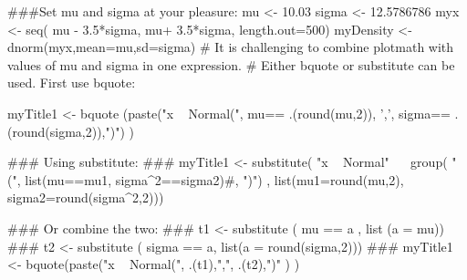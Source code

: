 \begin{Schunk}
\begin{Sinput}
 ###Set mu and sigma at your pleasure:
 mu <- 10.03
 sigma <- 12.5786786
 myx <- seq( mu - 3.5*sigma,  mu+ 3.5*sigma, length.out=500)
 myDensity <- dnorm(myx,mean=mu,sd=sigma)
 # It is challenging to combine plotmath with values of mu and sigma in one expression.
 # Either bquote or substitute can be used.  First use bquote:
 
 myTitle1 <- bquote (paste("x ~ Normal(", mu== .(round(mu,2)), ',', sigma== .(round(sigma,2)),")") )
 
 ### Using substitute:
 ### myTitle1 <-  substitute( "x ~ Normal" ~~ group( "(", list(mu==mu1, sigma^2==sigma2)#, ")") ,  list(mu1=round(mu,2), sigma2=round(sigma^2,2)))
 
 ### Or combine the two:
 ### t1 <- substitute ( mu == a ,  list (a = mu))
 ### t2 <- substitute ( sigma == a, list(a = round(sigma,2)))
 ### myTitle1 <- bquote(paste("x ~ Normal(", .(t1),",", .(t2),")" ) )
\end{Sinput}
\end{Schunk}
